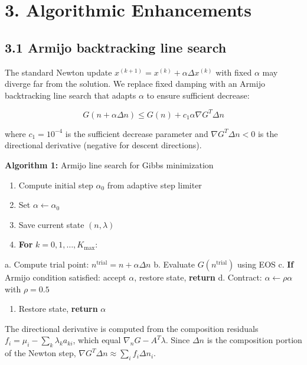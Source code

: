 \documentclass[review,3p]{elsarticle}
\begin{document}
\section{3. Algorithmic Enhancements}



\subsection{3.1 Armijo backtracking line search}

The standard Newton update $x^{(k+1)} = x^{(k)} + \alpha \Delta x^{(k)}$ with fixed $\alpha$ may diverge far from the solution. We replace fixed damping with an Armijo backtracking line search \citep{Armijo1966, NocedalWright2006} that adapts $\alpha$ to ensure sufficient decrease:

\begin{equation}
G(n + \alpha \Delta n) \leq G(n) + c_1 \alpha \nabla G^T \Delta n
\end{equation}

where $c_1 = 10^{-4}$ is the sufficient decrease parameter and $\nabla G^T \Delta n < 0$ is the directional derivative (negative for descent directions).

\textbf{Algorithm 1:} Armijo line search for Gibbs minimization

\begin{enumerate}
  \item Compute initial step $\alpha_0$ from adaptive step limiter
  \item Set $\alpha \leftarrow \alpha_0$
  \item Save current state $(n, \lambda)$
  \item \textbf{For} $k = 0, 1, \ldots, K_{\max}$:
\end{enumerate}
   a. Compute trial point: $n^{\text{trial}} = n + \alpha \Delta n$
   b. Evaluate $G(n^{\text{trial}})$ using EOS
   c. \textbf{If} Armijo condition satisfied: accept $\alpha$, restore state, \textbf{return}
   d. Contract: $\alpha \leftarrow \rho \alpha$ with $\rho = 0.5$
\begin{enumerate}
  \item Restore state, \textbf{return} $\alpha$
\end{enumerate}

The directional derivative is computed from the composition residuals $f_i = \mu_i - \sum_k \lambda_k a_{ki}$, which equal $\nabla_n G - A^T\lambda$. Since $\Delta n$ is the composition portion of the Newton step, $\nabla G^T \Delta n \approx \sum_i f_i \Delta n_i$.
\end{document}
